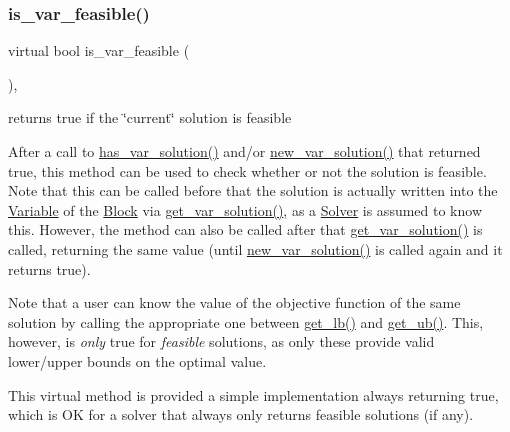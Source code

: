 \subsubsection{\texorpdfstring{is\+\_\+var\+\_\+feasible()}{is\_var\_feasible()}}
{\footnotesize\ttfamily virtual bool is\+\_\+var\+\_\+feasible (\begin{DoxyParamCaption}\item[{void}]{ }\end{DoxyParamCaption})\hspace{0.3cm}{\ttfamily [inline]}, {\ttfamily [virtual]}}



returns true if the \char`\"{}current\char`\"{} solution is feasible 

After a call to \mbox{\hyperlink{class_s_m_spp__di__unipi__it_1_1_solver_aa96263f4e0c59225f3f5d54f03fe31ee}{has\+\_\+var\+\_\+solution()}} and/or \mbox{\hyperlink{class_s_m_spp__di__unipi__it_1_1_solver_af109b504a566c90a4ea45c1574c128fe}{new\+\_\+var\+\_\+solution()}} that returned true, this method can be used to check whether or not the solution is feasible. Note that this can be called before that the solution is actually written into the \mbox{\hyperlink{class_s_m_spp__di__unipi__it_1_1_variable}{Variable}} of the \mbox{\hyperlink{class_s_m_spp__di__unipi__it_1_1_block}{Block}} via \mbox{\hyperlink{class_s_m_spp__di__unipi__it_1_1_solver_a91d7cd0dc4fa453406ef30db2bfa37a5}{get\+\_\+var\+\_\+solution()}}, as a \mbox{\hyperlink{class_s_m_spp__di__unipi__it_1_1_solver}{Solver}} is assumed to know this. However, the method can also be called after that \mbox{\hyperlink{class_s_m_spp__di__unipi__it_1_1_solver_a91d7cd0dc4fa453406ef30db2bfa37a5}{get\+\_\+var\+\_\+solution()}} is called, returning the same value (until \mbox{\hyperlink{class_s_m_spp__di__unipi__it_1_1_solver_af109b504a566c90a4ea45c1574c128fe}{new\+\_\+var\+\_\+solution()}} is called again and it returns true).

Note that a user can know the value of the objective function of the same solution by calling the appropriate one between \mbox{\hyperlink{class_s_m_spp__di__unipi__it_1_1_solver_a4a4dbe4c2416d531c4619ca94fc07d31}{get\+\_\+lb()}} and \mbox{\hyperlink{class_s_m_spp__di__unipi__it_1_1_solver_a7304d819b2eeff3d4ba650055b24e3a5}{get\+\_\+ub()}}. This, however, is {\itshape only} true for {\itshape feasible} solutions, as only these provide valid lower/upper bounds on the optimal value.

This virtual method is provided a simple implementation always returning true, which is OK for a solver that always only returns feasible solutions (if any). \mbox{\label{class_s_m_spp__di__unipi__it_1_1_solver_a81dba299d9c4ccc6c1e6be0a845142fd}} 
